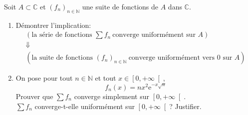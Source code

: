 \documentclass[a4paper,10pt]{report}
\begin{document}
\begin{Exercice}{} Soit $A\subset \mathbb{C}$ et $\left( f_{n}\right)_{n\in \mathbb{N}}$ une suite de fonctions de $A$ dans $\mathbb{C}$.

\begin{enumerate}
\item D\'{e}montrer l'implication:
	\begin{eqnarray*}
	& \left( \text{la s\'{e}rie de fonctions }\displaystyle\sum f_{n}\ \text{converge uniform\'{e}ment sur $A$}\right)& \\
	&\Downarrow &\\
	&\left( \text{la suite de fonctions\ }\left( f_{n}\right) _{n\in \mathbb{N}}\ \text{converge uniform\'{e}ment vers 0 sur $A$}\right)&
	\end{eqnarray*}
\item
On pose pour tout $n\in\mathbb{N}$ et tout $x\in\left[ 0,+\infty\right[ $, 
$$f_n(x)=nx^2\mathrm{e}^{-x\sqrt{n}}$$
Prouver que $\displaystyle\sum f_n$ converge simplement sur $\left[ 0,+\infty\right[$.\\
$\displaystyle\sum f_n$ converge-t-elle uniformément sur $\left[ 0,+\infty\right[$? Justifier.
\end{enumerate}
\end{Exercice}
\end{document}
